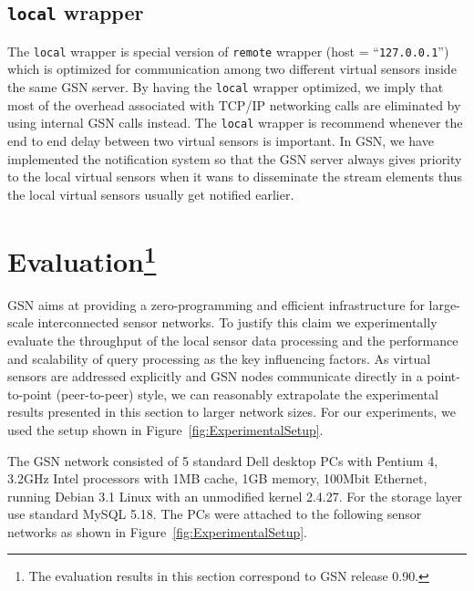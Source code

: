 \subsection{\texttt{local} wrapper}
The \verb|local| wrapper is special version of \texttt{remote} wrapper (host = ``\texttt{127.0.0.1}'') which is optimized
for communication among two different virtual sensors inside the same GSN server. By having the
\texttt{local} wrapper optimized, we imply that most of the overhead associated with TCP/IP networking
calls are eliminated by using internal GSN calls instead. The \texttt{local} wrapper is recommend whenever
the end to end delay between two virtual sensors is important. In GSN, we have implemented the 
notification system so that the GSN server always gives priority to the local virtual sensors when it wans to disseminate
the stream elements thus the local virtual sensors usually get notified earlier.



\section{Evaluation\footnote{The evaluation results in this section correspond to GSN release 0.90.}}
\label{sec:evaluation}

GSN aims at providing a zero-programming and efficient infrastructure for
large-scale interconnected sensor networks. To justify this claim we
experimentally evaluate the throughput of the local sensor data processing and
the performance and scalability of query processing as the key influencing
factors.  As virtual sensors are addressed explicitly and GSN nodes communicate
directly in a point-to-point (peer-to-peer) style, we can reasonably
extrapolate the experimental results presented in this section to larger
network sizes.  For our experiments, we used the setup shown in
Figure~\ref{fig:ExperimentalSetup}.

The GSN network consisted of 5 standard Dell desktop PCs with Pentium 4, 3.2GHz
Intel processors with 1MB cache, 1GB memory, 100Mbit Ethernet, running Debian
3.1 Linux with an unmodified kernel 2.4.27. For the storage layer use standard
MySQL 5.18.  The PCs were attached to the following sensor networks as shown in
Figure~\ref{fig:ExperimentalSetup}.

